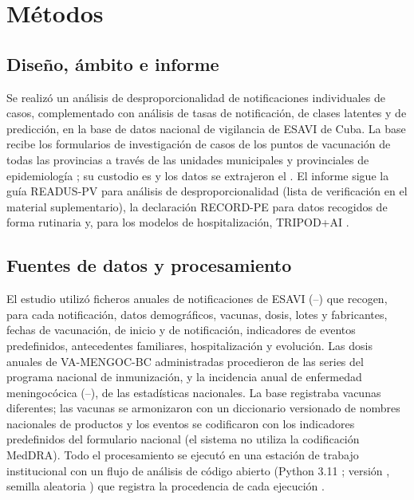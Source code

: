 \documentclass[11pt]{article}
\begin{document}
\section{Métodos}\label{sec:methods}

\subsection{Diseño, ámbito e informe}\label{sec:design}
Se realizó un análisis de desproporcionalidad de notificaciones individuales de casos,
complementado con análisis de tasas de notificación, de clases latentes y de predicción, en la base
de datos nacional de vigilancia de ESAVI de Cuba. La base recibe los formularios de investigación de
casos de los puntos de vacunación de todas las provincias a través de las unidades municipales y
provinciales de epidemiología \cite{Galindo2012,WHO2016AEFI}; su custodio es \VCustodian{} y los
datos se extrajeron el \VExtractionDate. El informe sigue la guía READUS-PV para análisis de
desproporcionalidad \cite{Fusaroli2024Statement,Fusaroli2024Elaboration} (lista de verificación en
el material suplementario), la declaración RECORD-PE para datos recogidos de forma rutinaria
\cite{Langan2018} y, para los modelos de hospitalización, TRIPOD+AI \cite{Collins2024}.

\subsection{Fuentes de datos y procesamiento}\label{sec:data}
El estudio utilizó \VNFiles{} ficheros anuales de notificaciones de ESAVI
(\VStudyFirstYear--\VStudyLastYear) que recogen, para cada notificación, datos demográficos, vacunas,
dosis, lotes y fabricantes, fechas de vacunación, de inicio y de notificación, \PONEventsScreened{}
indicadores de eventos predefinidos, antecedentes familiares, hospitalización y evolución. Las dosis
anuales de VA-MENGOC-BC administradas procedieron de las series del programa nacional de
inmunización, y la incidencia anual de enfermedad meningocócica (\POITSFirstYear--\POITSLastYear),
de las estadísticas nacionales. La base registraba \PONVaccines{} vacunas diferentes; las vacunas se
armonizaron con un diccionario versionado de nombres nacionales de productos y los eventos se
codificaron con los indicadores predefinidos del formulario nacional (el sistema no utiliza la
codificación MedDRA). Todo el procesamiento se ejecutó en una estación de trabajo institucional con
un flujo de análisis de código abierto (Python 3.11
\cite{Harris2020,Virtanen2020,McKinney2010,Seabold2010,Pedregosa2011,Hunter2007}; versión
\VCodeVersion, semilla aleatoria \VSeed) que registra la procedencia de cada ejecución
\cite{Sandve2013,MHRA2018}.
\end{document}
